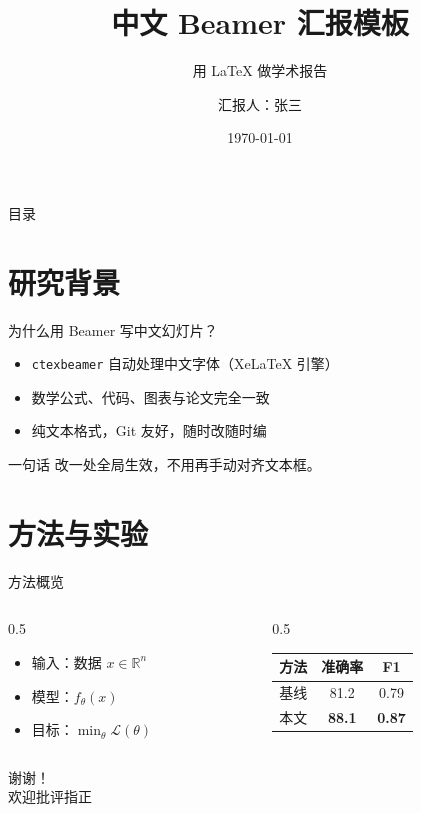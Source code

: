 \documentclass{ctexbeamer}
\title[简短标题]{中文 Beamer 汇报模板}
\subtitle{用 \LaTeX{} 做学术报告}
\author{汇报人：张三}
\institute{示例大学 · 计算机学院}
\date{\today}
\begin{document}
\begin{frame}
  \titlepage
\end{frame}

\begin{frame}{目录}
  \tableofcontents
\end{frame}

\section{研究背景}

\begin{frame}{为什么用 Beamer 写中文幻灯片？}
  \begin{itemize}
    \item \texttt{ctexbeamer} 自动处理中文字体（Xe\LaTeX{} 引擎）
    \item 数学公式、代码、图表与论文完全一致
    \item 纯文本格式，Git 友好，随时改随时编
  \end{itemize}
  \begin{block}{一句话}
    改一处全局生效，不用再手动对齐文本框。
  \end{block}
\end{frame}

\section{方法与实验}

\begin{frame}{方法概览}
  \begin{columns}
    \begin{column}{0.5\textwidth}
      \begin{itemize}
        \item 输入：数据 $x \in \mathbb{R}^n$
        \item 模型：$f_\theta(x)$
        \item 目标：$\min_\theta \mathcal{L}(\theta)$
      \end{itemize}
    \end{column}
    \begin{column}{0.5\textwidth}
      \begin{table}
        \centering
        \begin{tabular}{lcc}
          \toprule
          方法 & 准确率 & F1 \\
          \midrule
          基线 & 81.2 & 0.79 \\
          本文 & \textbf{88.1} & \textbf{0.87} \\
          \bottomrule
        \end{tabular}
      \end{table}
    \end{column}
  \end{columns}
\end{frame}

\begin{frame}
  \centering
  {\LARGE 谢谢！}\\[1em]
  欢迎批评指正
\end{frame}
\end{document}
